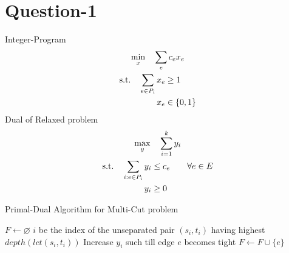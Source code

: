 \documentclass{article}
\newcommand{\set}[1]{\{#1\}}
\begin{document}
\section*{Question-1}
Integer-Program
\begin{gather*}
    \min_{x}\quad \sum_{e}c_ex_e \\
    \begin{aligned}
    \textup{s.t.}\quad \sum_{e \in P_i}x_e  &\ge  1\\
                       x_e  &\in  \set{0,1} \\
    \end{aligned}
\end{gather*}
Dual of Relaxed problem
\begin{gather*}
    \max_{y}\quad \sum_{i=1}^ky_i \\
    \begin{aligned}
    \textup{s.t.}\quad \sum_{i : e \in P_i}y_i  &\le  c_e \qquad \forall e \in E\\
                       y_i  &\ge  0 \\
    \end{aligned}
\end{gather*}
\begin{algorithm}
    \caption{Primal-Dual Algorithm for Multi-Cut problem}
    \begin{algorithmic}
            \State $F \leftarrow \varnothing$
            \Comment{}
            \State $i$  be the index of the unseparated pair $(s_i,t_i)$ having highest $depth(lct(s_i,t_i))$
            \State Increase $y_i$ such till edge $e$ becomes tight
            \State $F \leftarrow F \cup \set{e}$
            \EndWhile
        \EndProcedure
    \end{algorithmic}
\end{algorithm}
\end{document}
